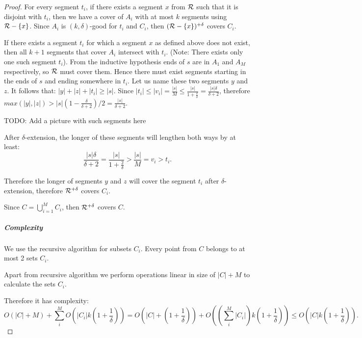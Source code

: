 \begin{proof}
For every segment $t_i$, if there exists a segment $x$ from $\mathcal{R}$ 
such that it is disjoint with $t_i$,
then we have a cover of $A_i$ with at most $k$
segments using $\mathcal{R} - \{x\}$.
Since $A_i$ is $(k, \delta)$-good for $t_i$ and $C_i$,
then $(\mathcal{R} - \{x\})^{+\delta}$ covers $C_i$.

If there exists a segment $t_i$ for which a segment $x$ as defined above
does not exist, then all $k+1$ segments that cover
$A_i$ intersect with $t_i$. (Note: There exists only one such segment $t_i$).
From the inductive hypothesis ends of $s$ are
in $A_1$ and $A_M$ respectively, so $\mathcal{R}$ must cover them.
Hence there must exist
segments starting in the ends of $s$ and ending somewhere in $t_i$.
Let us name these two segments $y$ and $z$. It follows that:
$|y| + |z| + |t_i| \ge |s|$.
Since $|t_i| \le |v_i| = \frac{|s|}{M} \le \frac{|s|}{1+\frac{2}{\delta}} = \frac{|s|\delta}{\delta+2}$,
therefore $max(|y|, |z|) > |s|(1-\frac{\delta}{\delta+2})/2 = \frac{|s|}{\delta+2}$.

TODO: Add a picture with such segments here

After $\delta$-extension, the longer of these segments will
lengthen both ways by at least:
$$\frac{|s|\delta}{\delta+2} = \frac{|s|}{1+\frac{2}{\delta}} > \frac{|s|}{M} = v_i > t_i.$$

Therefore the longer of segments $y$ and $z$ will cover the segment $t_i$
after $\delta$-extension, therefore $\mathcal{R}^{+\delta}$ covers $C_i$.

Since $C = \bigcup_{i=1}^M C_i$,
then $\mathcal{R}^{+\delta}$ covers $C$.

\subparagraph{Complexity}

We use the recursive algorithm for subsets $C_i$. Every point
from $C$ belongs to at most 2 sets $C_i$.

Apart from recursive algorithm we perform operations linear in
size of $|C| + M$ to calculate the sets $C_i$.

Therefore it has complexity:
$$O(|C|+M) + \sum_i^M O(|C_i|k(1+\frac{1}{\delta})) = 
O(|C| + (1+\frac{1}{\delta})) + O((\sum_i^M |C_i|)k(1+\frac{1}{\delta})) \le O(|C|k(1+\frac{1}{\delta})).$$

\end{proof}

